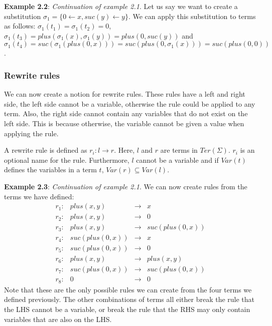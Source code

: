 \textbf{Example 2.2}: \textit{Continuation of example 2.1}. Let us say we want to create a substitution $\sigma_1 = \{ 0 \leftarrow x, suc(y) \leftarrow y \}$. We can apply this substitution to terms as follows: $\sigma_1(t_1) = \sigma_1(t_2) = 0$, $\sigma_1(t_3) = plus(\sigma_1(x), \sigma_1(y)) = plus(0, suc(y))$ and $\sigma_1(t_4) = suc(\sigma_1(plus(0, x))) = suc(plus(0, \sigma_1(x))) = suc(plus(0, 0))$.

\subsubsection*{Rewrite rules}
We can now create a notion for rewrite rules. These rules have a left and right side, the left side cannot be a variable, otherwise the rule could be applied to any term. Also, the right side cannot contain any variables that do not exist on the left side. This is because otherwise, the variable cannot be given a value when applying the rule.
\begin{definition}
A rewrite rule is defined as $r_i : l \rightarrow r$. Here, $l$ and $r$ are terms in $\textit{Ter}(\Sigma)$. $r_i$ is an optional name for the rule. Furthermore, $l$ cannot be a variable and if $\textit{Var}(t)$ defines the variables in a term $t$, $\textit{Var}(r) \subseteq \textit{Var}(l)$. 
\end{definition}

\textbf{Example 2.3}: \textit{Continuation of example 2.1}. We can now create rules from the terms we have defined:\newline
$$
\begin{array}{lrcl}
    r_1: & plus(x, y) & \rightarrow & x \\
    r_2: & plus(x, y) & \rightarrow & 0 \\
    r_3: & plus(x, y) & \rightarrow & suc(plus(0, x))\\
    r_4: & suc(plus(0, x)) & \rightarrow & x\\
    r_5: & suc(plus(0, x)) & \rightarrow & 0\\
    r_6: & plus(x, y) & \rightarrow & plus(x, y) \\
    r_7: & suc(plus(0, x)) & \rightarrow & suc(plus(0, x))\\
    r_8: & 0 & \rightarrow & 0
\end{array}
$$
Note that these are the only possible rules we can create from the four terms we defined previously. The other combinations of terms all either break the rule that the LHS cannot be a variable, or break the rule that the RHS may only contain variables that are also on the LHS.

